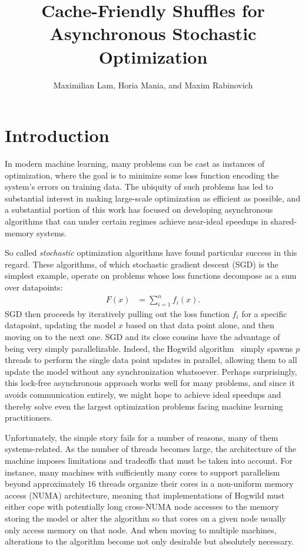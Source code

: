 \documentclass[times,11pt]{article}
\numberwithin{equation}{section}		%
\numberwithin{figure}{section}			%
\numberwithin{table}{section}				%
\begin{document}
\title{Cache-Friendly Shuffles for Asynchronous Stochastic Optimization}
\author{Maximilian Lam, Horia Mania, and Maxim Rabinovich}

\maketitle
\section{Introduction}

In modern machine learning, many problems can be cast as instances of optimization, where the goal is to minimize some loss
function encoding the system's errors on training data. The ubiquity of such problems has led to substantial interest in making large-scale
optimization as efficient as possible, and a substantial portion of this work has focused on developing asynchronous algorithms that can under certain regimes
achieve near-ideal speedups in shared-memory systems.

So called {\it stochastic} optimization algorithms have found particular success in this regard. These algorithms, of which stochastic gradient descent (SGD) is the simplest example, operate
on problems whose loss functions decompose as a sum over datapoints:
\begin{align*}
F\left(x\right) & = \sum_{i = 1}^{n} f_{i}\left(x\right) .
\end{align*}
SGD then proceeds by iteratively pulling out the loss function $f_{i}$ for a specific datapoint, updating the model $x$ based on that data point alone, and then moving on to the next one.
SGD and its close cousins have the advantage of being very simply parallelizable. Indeed, the Hogwild algorithm~\citep{} simply spawns $p$ threads to perform the single data point updates in parallel,
allowing them to all update the model without any synchronization whatsoever. Perhaps surprisingly, this lock-free asynchronous approach works well for many problems, and since it avoids communication entirely,
we might hope to achieve ideal speedups and thereby solve even the largest optimization problems facing machine learning practitioners.


Unfortunately, the simple story fails for a number of reasons, many of them systems-related. As the number of threads becomes large, the architecture of the machine
imposes limitations and tradeoffs that must be taken into account. For instance, many machines with sufficiently many cores to support parallelism beyond approximately $16$
threads organize their cores in a non-uniform memory access (NUMA) architecture, meaning that implementations of Hogwild must either cope with potentially long cross-NUMA node
accesses to the memory storing the model or alter the algorithm so that cores on a given node usually only access memory on that node. And when moving to multiple machines,
alterations to the algorithm become not only desirable but absolutely necessary.
\end{document}
